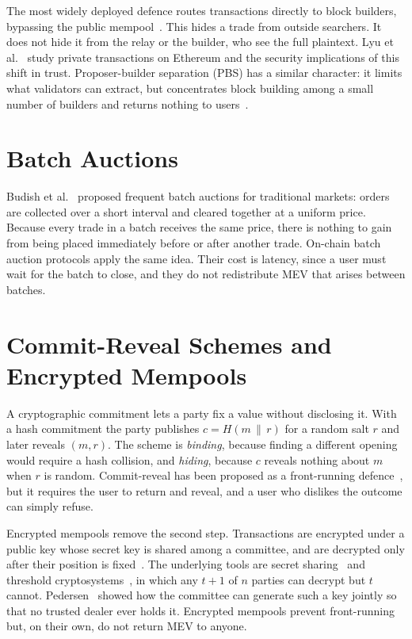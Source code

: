 The most widely deployed defence routes transactions directly to block builders, bypassing the public mempool~\cite{flashbots2022}. This hides a trade from outside searchers. It does not hide it from the relay or the builder, who see the full plaintext. Lyu et al.~\cite{lyu2022empirical} study private transactions on Ethereum and the security implications of this shift in trust. Proposer-builder separation (PBS) has a similar character: it limits what validators can extract, but concentrates block building among a small number of builders and returns nothing to users~\cite{heimbach2023pbs}.

\section{Batch Auctions}

Budish et al.~\cite{budish2015hft} proposed frequent batch auctions for traditional markets: orders are collected over a short interval and cleared together at a uniform price. Because every trade in a batch receives the same price, there is nothing to gain from being placed immediately before or after another trade. On-chain batch auction protocols apply the same idea. Their cost is latency, since a user must wait for the batch to close, and they do not redistribute MEV that arises between batches.

\section{Commit-Reveal Schemes and Encrypted Mempools}

A cryptographic commitment lets a party fix a value without disclosing it. With a hash commitment the party publishes $c=H(m\,\|\,r)$ for a random salt $r$ and later reveals $(m,r)$. The scheme is \emph{binding}, because finding a different opening would require a hash collision, and \emph{hiding}, because $c$ reveals nothing about $m$ when $r$ is random. Commit-reveal has been proposed as a front-running defence~\cite{yang2022sok}, but it requires the user to return and reveal, and a user who dislikes the outcome can simply refuse.

Encrypted mempools remove the second step. Transactions are encrypted under a public key whose secret key is shared among a committee, and are decrypted only after their position is fixed~\cite{blindperm2023}. The underlying tools are secret sharing~\cite{shamir1979share} and threshold cryptosystems~\cite{desmedt1989threshold}, in which any $t+1$ of $n$ parties can decrypt but $t$ cannot. Pedersen~\cite{pedersen1991threshold} showed how the committee can generate such a key jointly so that no trusted dealer ever holds it. Encrypted mempools prevent front-running but, on their own, do not return MEV to anyone.

